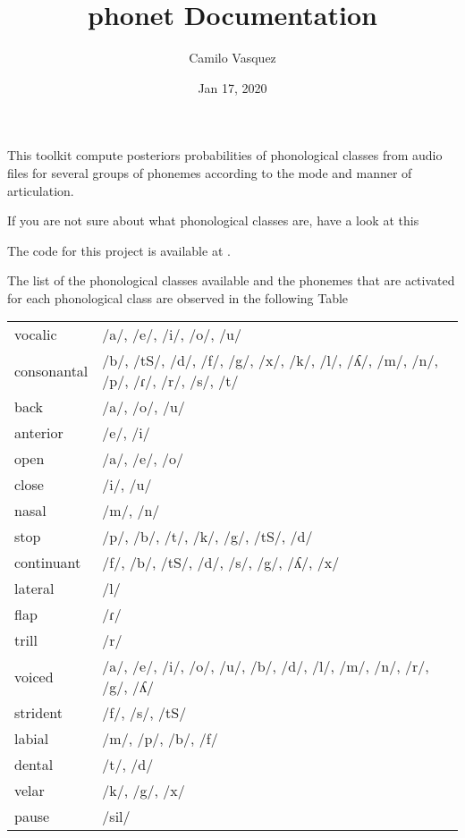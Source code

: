 \documentclass[letterpaper,10pt,english]{sphinxmanual}
\title{phonet Documentation}
\date{Jan 17, 2020}
\author{Camilo Vasquez}
\begin{document}
\maketitle
\sphinxtableofcontents
{}\label{\detokenize{index::doc}}


This toolkit compute posteriors probabilities of phonological classes from audio files for several groups of phonemes according to the mode and manner of articulation.

If you are not sure about what phonological classes are, have a look at this

The code for this project is available at  .

The list of the phonological classes available and the phonemes that are activated for each phonological class are observed in the following Table

\noindent\begin{tabulary}{\linewidth}{|L|L|}
\hline
{}\relax &\relax \\
\hline
vocalic
&
/a/, /e/, /i/, /o/, /u/
\\
\hline
consonantal
&
/b/, /tS/, /d/, /f/, /g/, /x/, /k/, /l/, /ʎ/, /m/, /n/, /p/, /ɾ/, /r/, /s/, /t/
\\
\hline
back
&
/a/, /o/, /u/
\\
\hline
anterior
&
/e/, /i/
\\
\hline
open
&
/a/, /e/, /o/
\\
\hline
close
&
/i/, /u/
\\
\hline
nasal
&
/m/, /n/
\\
\hline
stop
&
/p/, /b/, /t/, /k/, /g/, /tS/, /d/
\\
\hline
continuant
&
/f/, /b/, /tS/, /d/, /s/, /g/, /ʎ/, /x/
\\
\hline
lateral
&
/l/
\\
\hline
flap
&
/ɾ/
\\
\hline
trill
&
/r/
\\
\hline
voiced
&
/a/, /e/, /i/, /o/, /u/, /b/, /d/, /l/, /m/, /n/, /r/, /g/, /ʎ/
\\
\hline
strident
&
/f/, /s/, /tS/
\\
\hline
labial
&
/m/, /p/, /b/, /f/
\\
\hline
dental
&
/t/, /d/
\\
\hline
velar
&
/k/, /g/, /x/
\\
\hline
pause
&
/sil/
\\
\hline\end{tabulary}
\end{document}
